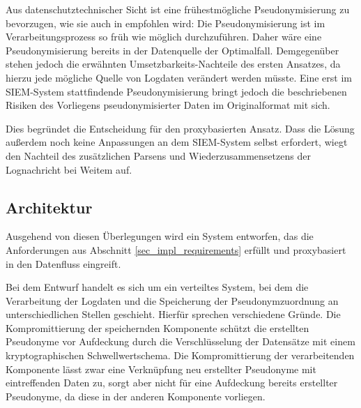 Aus datenschutztechnischer Sicht ist eine frühestmögliche Pseudonymisierung zu bevorzugen, wie sie auch in \cite{schwartmann2017} empfohlen wird: 
\glqq{}Die Pseudonymisierung ist im Verarbeitungsprozess so früh wie möglich durchzuführen.\grqq{}
Daher wäre eine Pseudonymisierung bereits in der Datenquelle der Optimalfall. Demgegenüber stehen jedoch die erwähnten Umsetzbarkeits-Nachteile des ersten Ansatzes, da hierzu jede mögliche Quelle von Logdaten verändert werden müsste. Eine erst im SIEM-System stattfindende Pseudonymisierung bringt jedoch die beschriebenen Risiken des Vorliegens pseudonymisierter Daten im Originalformat mit sich.

Dies begründet die Entscheidung für den proxybasierten Ansatz. Dass die Lösung außerdem noch keine Anpassungen an dem SIEM-System selbst erfordert, wiegt den Nachteil des zusätzlichen Parsens und Wiederzusammensetzens der Lognachricht bei Weitem auf.

\subsection{Architektur}

\label{sec_over_architecture}


Ausgehend von diesen Überlegungen wird ein System entworfen, das die Anforderungen aus Abschnitt \ref{sec_impl_requirements} erfüllt und proxybasiert in den Datenfluss eingreift. 


Bei dem Entwurf handelt es sich um ein verteiltes System, bei dem die Verarbeitung der Logdaten und die Speicherung der Pseudonymzuordnung an unterschiedlichen Stellen geschieht. Hierfür sprechen verschiedene Gründe. Die Kompromittierung der speichernden Komponente schützt die erstellten Pseudonyme vor Aufdeckung durch die Verschlüsselung der Datensätze mit einem kryptographischen Schwellwertschema. Die Kompromittierung der verarbeitenden Komponente lässt zwar eine Verknüpfung neu erstellter Pseudonyme mit eintreffenden Daten zu, sorgt aber nicht für eine Aufdeckung bereits erstellter Pseudonyme, da diese in der anderen Komponente vorliegen.

